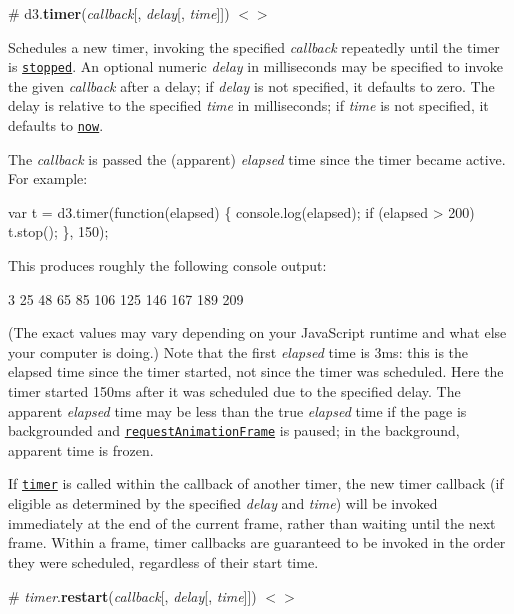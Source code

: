 \label{_timer}%
\# d3.{\bfseries timer}({\itshape callback}\mbox{[}, {\itshape delay}\mbox{[}, {\itshape time}\mbox{]}\mbox{]}) \href{https://github.com/d3/d3-timer/blob/master/src/timer.js#L52}{\tt $<$$>$}

Schedules a new timer, invoking the specified {\itshape callback} repeatedly until the timer is \href{#timer_stop}{\tt stopped}. An optional numeric {\itshape delay} in milliseconds may be specified to invoke the given {\itshape callback} after a delay; if {\itshape delay} is not specified, it defaults to zero. The delay is relative to the specified {\itshape time} in milliseconds; if {\itshape time} is not specified, it defaults to \href{#now}{\tt now}.

The {\itshape callback} is passed the (apparent) {\itshape elapsed} time since the timer became active. For example\+:


\begin{DoxyCode}
var t = d3.timer(function(elapsed) \{
  console.log(elapsed);
  if (elapsed > 200) t.stop();
\}, 150);
\end{DoxyCode}


This produces roughly the following console output\+:


\begin{DoxyCode}
3
25
48
65
85
106
125
146
167
189
209
\end{DoxyCode}


(The exact values may vary depending on your Java\+Script runtime and what else your computer is doing.) Note that the first {\itshape elapsed} time is 3ms\+: this is the elapsed time since the timer started, not since the timer was scheduled. Here the timer started 150ms after it was scheduled due to the specified delay. The apparent {\itshape elapsed} time may be less than the true {\itshape elapsed} time if the page is backgrounded and \href{https://developer.mozilla.org/en-US/docs/Web/API/window/requestAnimationFrame}{\tt request\+Animation\+Frame} is paused; in the background, apparent time is frozen.

If \href{#timer}{\tt timer} is called within the callback of another timer, the new timer callback (if eligible as determined by the specified {\itshape delay} and {\itshape time}) will be invoked immediately at the end of the current frame, rather than waiting until the next frame. Within a frame, timer callbacks are guaranteed to be invoked in the order they were scheduled, regardless of their start time.

\label{_timer_restart}%
\# {\itshape timer}.{\bfseries restart}({\itshape callback}\mbox{[}, {\itshape delay}\mbox{[}, {\itshape time}\mbox{]}\mbox{]}) \href{https://github.com/d3/d3-timer/blob/master/src/timer.js#L31}{\tt $<$$>$}

